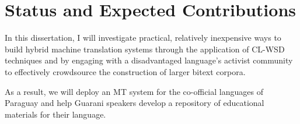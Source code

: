 \section{Status and Expected Contributions}

In this dissertation, I will investigate practical, relatively inexpensive ways
to build hybrid machine translation systems through the application of CL-WSD
techniques and by engaging with a disadvantaged language's activist community
to effectively crowdsource the construction of larger bitext corpora.

As a result, we will deploy an MT system for the co-official languages of
Paraguay and help Guarani speakers develop a repository of educational
materials for their language.

